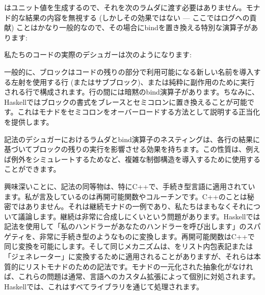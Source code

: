 はユニット値を生成するので、それを次のラムダに渡す必要はありません。モナド的な結果の内容を無視する (しかしその効果ではない --- ここではログへの貢献) ことはかなり一般的なので、その場合にbindを置き換える特別な演算子があります: 

私たちのコードの実際のデシュガーは次のようになります: 

一般的に、ブロックはコードの残りの部分で利用可能になる新しい名前を導入する左射を使用する行 (またはサブブロック)、または純粋に副作用のために実行される行で構成されます。行の間には暗黙のbind演算子があります。ちなみに、Haskellではブロックの書式をブレースとセミコロンに置き換えることが可能です。これはモナドをセミコロンをオーバーロードする方法として説明する正当化を提供します。

記法のデシュガーにおけるラムダとbind演算子のネスティングは、各行の結果に基づいてブロックの残りの実行を影響させる効果を持ちます。この性質は、例えば例外をシミュレートするためなど、複雑な制御構造を導入するために使用することができます。

興味深いことに、記法の同等物は、特にC++で、手続き型言語に適用されています。私が言及しているのは再開可能関数やコルーチンです。C++のことは秘密ではありません。それは継続モナドの一例であり、私たちはまもなくそれについて議論します。継続は非常に合成しにくいという問題があります。Haskellでは記法を使用して「私のハンドラーがあなたのハンドラーを呼び出します」のスパゲティを、非常に手続き型のようなものに変換します。再開可能関数はC++で同じ変換を可能にします。そして同じメカニズムは、をリスト内包表記または「ジェネレーター」に変換するために適用されることがありますが、それらは本質的にリストモナドのための記法です。モナドの一元化された抽象化がなければ、これらの問題は通常、言語へのカスタム拡張によって個別に対処されます。Haskellでは、これはすべてライブラリを通じて処理されます。

